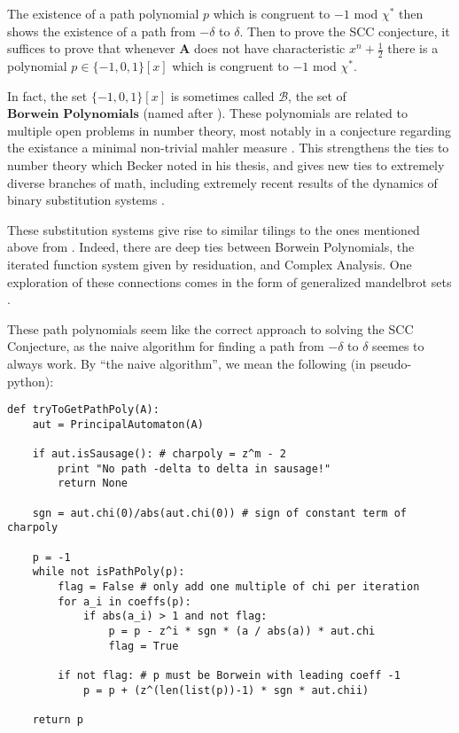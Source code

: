 \documentclass{article}
\newcommand{\2}{\textbf{2}}
\newcommand{\Am}{\textbf{A}}
\theoremstyle{definition}
\begin{document}
The existence of a path polynomial $p$ which is congruent to $-1$ mod $\chi^*$
then shows the existence of a path from $-\delta$ to $\delta$.
Then to prove the SCC conjecture, it suffices to prove that whenever $\Am$ 
does not have characteristic $x^n + \frac{1}{2}$ there is a polynomial 
$p \in \{-1,0,1\}[x]$ which is congruent to $-1$ mod $\chi^*$. 

In fact, the set $\{-1,0,1\}[x]$ is sometimes called $\mathcal{B}$, the
set of $\textbf{Borwein Polynomials}$ 
(named after \cite{Borwein97:restricted-coefficients}). 
These polynomials are related to multiple open problems in number theory, 
most notably in a conjecture regarding the existance a minimal non-trivial 
mahler measure \cite{Mossinghoff:thesis}. This strengthens the ties to 
number theory which Becker noted in his thesis, and gives new ties to 
extremely diverse branches of math, including extremely recent results of 
the dynamics of binary substitution systems \cite{Baake17:substitutions}.

These substitution systems give rise to similar tilings to the ones 
mentioned above from \cite{LagariasWang96:tiles,LagariasWang97:integral_tiles}.
Indeed, there are deep ties between Borwein Polynomials, the iterated
function system given by residuation, and Complex Analysis. One exploration
of these connections comes in the form of generalized mandelbrot sets
\cite{Calegari2017:schottky-semigroups}.

These path polynomials seem like the correct approach to solving the SCC
Conjecture, as the naive algorithm for finding a path from $-\delta$ to
$\delta$ seemes to always work. By ``the naive algorithm'', we mean the 
following (in pseudo-python):

\begin{lstlisting}
def tryToGetPathPoly(A):
    aut = PrincipalAutomaton(A)

    if aut.isSausage(): # charpoly = z^m - 2
        print "No path -delta to delta in sausage!"
        return None

    sgn = aut.chi(0)/abs(aut.chi(0)) # sign of constant term of charpoly

    p = -1
    while not isPathPoly(p):
        flag = False # only add one multiple of chi per iteration
        for a_i in coeffs(p):
            if abs(a_i) > 1 and not flag:
                p = p - z^i * sgn * (a / abs(a)) * aut.chi
                flag = True

        if not flag: # p must be Borwein with leading coeff -1
            p = p + (z^(len(list(p))-1) * sgn * aut.chii)

    return p
\end{lstlisting}
\end{document}
